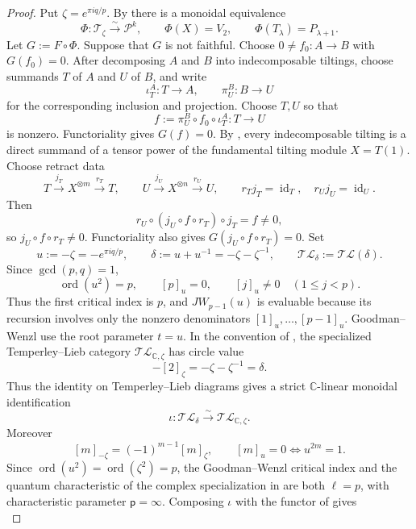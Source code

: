 \documentclass[12pt,leqno]{amsart}
\numberwithin{equation}{section}
\newcommand{\id}{\operatorname{id}}
\newcommand{\TL}{\mathcal{TL}}
\def\C{\mathbb{C}}
\begin{document}
\begin{proof}
Put $\zeta=e^{\pi iq/p}$.  By \cite[Proposition~6.4 and Theorem~6.6]{McRaeYang} there is a
monoidal equivalence
\begin{equation}\label{eq:tilting-projective-equivalence}
 \Phi:\mathcal T_\zeta\xrightarrow{\sim}\mathcal P^k,
 \qquad \Phi(X)=V_2,\qquad \Phi(T_\lambda)=P_{\lambda+1}.
\end{equation}
Let $G:=F\circ\Phi$.  Suppose that $G$ is not faithful.  Choose
$0\ne f_0:A\to B$ with $G(f_0)=0$.  After decomposing $A$ and $B$ into indecomposable tiltings, choose
summands $T$ of $A$ and $U$ of $B$, and write
\[
 \iota_T^A:T\longrightarrow A,
 \qquad
 \pi_U^B:B\longrightarrow U
\]
for the corresponding inclusion and projection.  Choose $T,U$ so that
\[
 f:=\pi_U^B\circ f_0\circ\iota_T^A:T\longrightarrow U
\]
is nonzero.  Functoriality gives $G(f)=0$.  By \cite[Remark~2.11]{SuttonTubbenhauerWedrichZhu}, every
indecomposable tilting is a direct summand of a tensor power of the
fundamental tilting module $X=T(1)$.
Choose retract data
\[
 T\xrightarrow{j_T}X^{\otimes m}\xrightarrow{r_T}T,
 \qquad
 U\xrightarrow{j_U}X^{\otimes n}\xrightarrow{r_U}U,
 \qquad r_Tj_T=\id_T,\quad r_Uj_U=\id_U.
\]
Then
\[
 r_U\circ(j_U\circ f\circ r_T)\circ j_T=f\ne0,
\]
so $j_U\circ f\circ r_T\ne0$.  Functoriality also gives
$G(j_U\circ f\circ r_T)=0$.  Set
\[
 u:=-\zeta=-e^{\pi iq/p},\qquad
 \delta:=u+u^{-1}=-\zeta-\zeta^{-1},
 \qquad \TL_\delta:=\TL(\delta).
\]
Since $\gcd(p,q)=1$,
\[
 \operatorname{ord}(u^2)=p,\qquad
 [p]_u=0,\qquad [j]_u\ne0\quad(1\le j<p).
\]
Thus the first critical index is $p$, and $JW_{p-1}(u)$ is evaluable
because its recursion involves only the nonzero denominators
$[1]_u,\ldots,[p-1]_u$.  Goodman--Wenzl use the root parameter $t=u$.  In the convention of
\cite{SuttonTubbenhauerWedrichZhu}, the specialized Temperley--Lieb
category $\TL_{\C,\zeta}$ has circle value
\[
 -[2]_\zeta=-\zeta-\zeta^{-1}=\delta.
\]
Thus the identity on Temperley--Lieb diagrams gives a strict
$\C$-linear monoidal identification
\[
 \iota:\TL_\delta\xrightarrow{\sim}\TL_{\C,\zeta}.
\]
Moreover
\[
 [m]_{-\zeta}=(-1)^{m-1}[m]_\zeta,
 \qquad
 [m]_u=0\iff u^{2m}=1.
\]
Since $\operatorname{ord}(u^2)=\operatorname{ord}(\zeta^2)=p$, the
Goodman--Wenzl critical index and the quantum characteristic of the
complex specialization in \cite{SuttonTubbenhauerWedrichZhu} are both
$\ell=p$, with characteristic parameter $\mathsf p=\infty$.  Composing
$\iota$ with the functor of
\cite[Proposition~2.13]{SuttonTubbenhauerWedrichZhu} gives
\begin{equation}\label{eq:TL-fullness}

\end{equation}
\end{proof}
\end{document}
